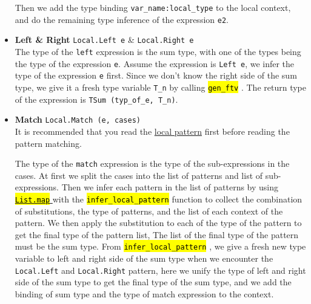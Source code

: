 \documentclass{article}
\newcommand{\highlighttexttt}[2][black]{ %
  \sethlcolor{cyan!10} %
  \texttt{\textcolor{#1}{\hl{#2}}}
}
\begin{document}
\begin{itemize}
                  Then we add the type binding \texttt{var\_name:local\_type} to the local context, and do the remaining type inference of the expression \texttt{e2}.
            \item \textbf{Left \& Right} \texttt{Local.Left e} \& \texttt{Local.Right e}\\
                  The type of the \texttt{left} expression is the sum type, with one of the types being the type of the expression \texttt{e}.
                  Assume the expression is \texttt{Left e}, we infer the type of the expression \texttt{e} first.
                  Since we don't know the right side of the sum type, we give it a fresh type variable \texttt{T\_n} by calling \highlighttexttt{gen\_ftv}.
                  The return type of the expression is \texttt{TSum (typ\_of\_e, T\_n)}.
            \item \textbf{Match} \texttt{Local.Match (e, cases)}\\
                  It is recommended that you read the \hyperref[local_pattern]{local pattern} first before reading the pattern matching.

                  The type of the \texttt{match} expression is the type of the sub-expressions in the cases. At first we
                  split the cases into the list of patterns and list of sub-expressions. Then we infer each pattern in the list of patterns
                  by using \href{https://ocaml.org/manual/5.2/api/List.html#VALmap}{\highlighttexttt[orange]{List.map}} with the \highlighttexttt{infer\_local\_pattern} function to collect the combination of substitutions,
                  the type of patterns, and the list of each context of the pattern. We then apply the substitution to each of the type of the pattern
                  to get the final type of the pattern list, The list of the final type of the pattern must be the sum type. From \highlighttexttt{infer\_local\_pattern},
                  we give a fresh new type variable to left and right side of the sum type when we encounter the \texttt{Local.Left} and \texttt{Local.Right} pattern,
                  here we unify the type of left and right side of the sum type to get the final type of the sum type,
                  and we add the binding of sum type and the type of match expression to the context.


\end{itemize}
\end{document}
